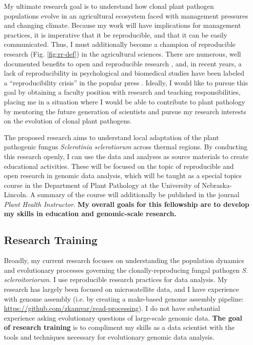 \documentclass[12pt,letterpaper]{article}
\begin{document}
My ultimate research goal is to understand how clonal plant pathogen populations evolve in an agricultural ecosystem faced with management pressures and changing climate.
Because my work will have implications for management practices, it is imperative that it be reproducible, and that it can be easily communicated.  
Thus, I must additionally become a champion of reproducible research (Fig. \ref{fig:rr-def}) in the agricultural sciences. 
There are numerous, well documented benefits to open and reproducible research \citep{mckiernan2016open}, and, in recent years, a lack of reproducibility in psychological and biomedical studies have been labeled a ``reproducibility crisis'' in the popular press \citep{baker2016scientists,patil2016statistical}.
Ideally, I would like to pursue this goal by obtaining a faculty position with
research and teaching responsibilities, placing me in a situation where I would be able to contribute to plant pathology by mentoring the future generation of scientists and pursue my research interests on the evolution of clonal plant pathogens.

The proposed research aims to understand local adaptation of the plant pathogenic fungus \textit{Sclerotinia sclerotiorum} across thermal regions. 
By conducting this research openly, I can use the data and analyses as source materials to create educational activities. 
These will be focused on the topic of reproducible and open research in genomic data analysis, which will be taught as a special topics course in the Department of Plant Pathology at the University of Nebraska-Lincoln. 
A summary of the course will additionally be published in the journal \textit{Plant Health Instructor}. 
\textbf{My overall goals for this fellowship are to develop my skills in education and genomic-scale research.} 

\subsection{Research Training}

Broadly, my current research focuses on understanding the population dynamics and evolutionary processes governing the clonally-reproducing fungal pathogen \textit{S. scleroitoriorum}.
I use reproducible research practices for data analysis. 
My research has largely been focused on microsatellite data, and I have experience with genome assembly (i.e. by creating a make-based genome assembly pipeline: \url{https://github.com/zkamvar/read-processing}).
I do not have substantial experience asking evolutionary questions of large-scale genomic data. 
\textbf{The goal of research training} is to compliment my skills as a data scientist with the tools and techniques necessary for evolutionary genomic data analysis. 
\end{document}
